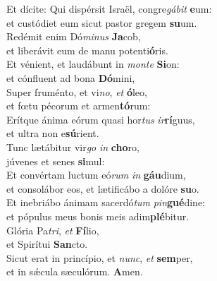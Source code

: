 \evenverse Et dícite: Qui dispérsit Israël, congre\textit{gá}\textit{bit} \textbf{e}um:~\*\\
\evenverse et custódiet eum sicut pastor gregem \textbf{su}um.\\
\oddverse Redémit enim Dó\textit{mi}\textit{nus} \textbf{Ja}cob,~\*\\
\oddverse et liberávit eum de manu potenti\textbf{ó}ris.\\
\evenverse Et vénient, et laudábunt in \textit{mon}\textit{te} \textbf{Si}on:~\*\\
\evenverse et cónfluent ad bona \textbf{Dó}mini,\\
\oddverse Super fruménto, et vi\textit{no}, \textit{et} \textbf{ó}leo,~\*\\
\oddverse et fœtu pécorum et armen\textbf{tó}rum:\\
\evenverse Erítque ánima eórum quasi hor\textit{tus} \textit{ir}\textbf{rí}guus,~\*\\
\evenverse et ultra non e\textbf{sú}rient.\\
\oddverse Tunc lætábitur vir\textit{go} \textit{in} \textbf{cho}ro,~\*\\
\oddverse júvenes et senes \textbf{si}mul:\\
\evenverse Et convértam luctum eó\textit{rum} \textit{in} \textbf{gáu}dium,~\*\\
\evenverse et consolábor eos, et lætificábo a dolóre \textbf{su}o.\\
\oddverse Et inebriábo ánimam sacerdó\textit{tum} \textit{pin}\textbf{gué}dine:~\*\\
\oddverse et pópulus meus bonis meis adim\textbf{plé}bitur.\\
\evenverse Glória Pa\textit{tri}, \textit{et} \textbf{Fí}lio,~\*\\
\evenverse et Spirítui \textbf{San}cto.\\
\oddverse Sicut erat in princípio, et \textit{nunc}, \textit{et} \textbf{sem}per,~\*\\
\oddverse et in sǽcula sæculórum. \textbf{A}men.\\
